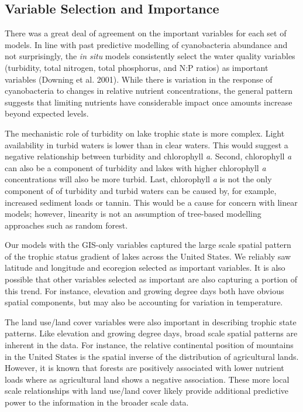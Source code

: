\documentclass[11pt,]{article}
\begin{document}
\subsection{Variable Selection and
Importance}\label{variable-selection-and-importance}

There was a great deal of agreement on the important variables for each
set of models. In line with past predictive modelling of cyanobacteria
abundance and not surprisingly, the \emph{in situ} models consistently
select the water quality variables (turbidity, total nitrogen, total
phosphorus, and N:P ratios) as important variables (Downing et al.
2001). While there is variation in the response of cyanobacteria to
changes in relative nutrient concentrations, the general pattern
suggests that limiting nutrients have considerable impact once amounts
increase beyond expected levels.

The mechanistic role of turbidity on lake trophic state is more complex.
Light availability in turbid waters is lower than in clear waters. This
would suggest a negative relationship between turbidity and chlorophyll
\emph{a}. Second, chlorophyll \emph{a} can also be a component of
turbidity and lakes with higher chlorophyll \emph{a} concentrations will
also be more turbid. Last, chlorophyll \emph{a} is not the only
component of of turbidity and turbid waters can be caused by, for
example, increased sediment loads or tannin. This would be a cause for
concern with linear models; however, linearity is not an assumption of
tree-based modelling approaches such as random forest.

Our models with the GIS-only variables captured the large scale spatial
pattern of the trophic status gradient of lakes across the United
States. We reliably saw latitude and longitude and ecoregion selected as
important variables. It is also possible that other variables selected
as important are also capturing a portion of this trend. For instance,
elevation and growing degree days both have obvious spatial components,
but may also be accounting for variation in temperature.

The land use/land cover variables were also important in describing
trophic state patterns. Like elevation and growing degree days, broad
scale spatial patterns are inherent in the data. For instance, the
relative continental position of mountains in the United States is the
spatial inverse of the distribution of agricultural lands. However, it
is known that forests are positively associated with lower nutrient
loads where as agricultural land shows a negative association. These
more local scale relationships with land use/land cover likely provide
additional predictive power to the information in the broader scale
data.
\end{document}

